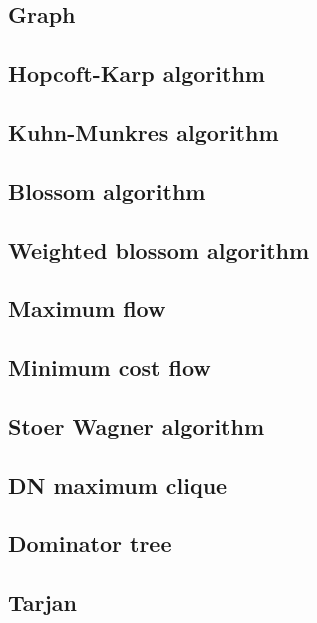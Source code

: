 \documentclass[titlepage,a4paper,10pt]{article}
\begin{document}
\begin{multicols}{2}
\begin{spacing}{0.6}
{		\section{Graph}
				
			\subsection{Hopcoft-Karp algorithm}
				
			\subsection{Kuhn-Munkres algorithm}
				
			\subsection{Blossom algorithm}
				
			\subsection{Weighted blossom algorithm}
				
			\subsection{Maximum flow}
				
			\subsection{Minimum cost flow}
				
			\subsection{Stoer Wagner algorithm}
				
			\subsection{DN maximum clique}
				
			\subsection{Dominator tree}
				
			\subsection{Tarjan}
				
}
\end{spacing}
\end{multicols}
\end{document}
